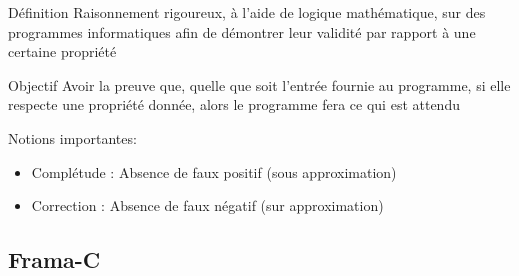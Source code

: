 \documentclass[french]{beamer}
\begin{document}
\begin{frame}


\begin{block}{Définition}
    \rightskip=0pt\leftskip=0pt
    Raisonnement rigoureux, à l'aide de logique mathématique, sur des programmes informatiques afin de démontrer leur validité par rapport à une certaine propriété
\end{block}

\bigskip

\begin{block}{Objectif}
    \rightskip=0pt\leftskip=0pt
    Avoir la preuve que, quelle que soit l’entrée fournie au programme, si elle respecte une propriété donnée, alors le programme fera ce qui est attendu
\end{block}

\bigskip

Notions importantes:
\begin{itemize}
	\item Complétude : Absence de faux positif (sous approximation) %
	\item Correction : Absence de faux négatif (sur approximation) %
\end{itemize}









\end{frame}


\subsection{Frama-C}
\end{document}

